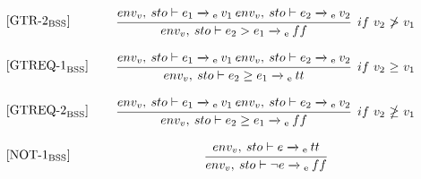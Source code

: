 \begin{equation}
\begin{minipage}{.2\linewidth}
$[\text{GTR-2}_\text{BSS}]$
\end{minipage}
\begin{minipage}{.8\linewidth}
\centering
$\cfrac{env_v, \: sto \vdash e_1 \xrightarrow{}\textsubscript{e} \: v_1 \: env_v, \: sto \vdash e_2 \xrightarrow{}\textsubscript{e} \: v_2}{env_v, \: sto \vdash e_2 > e_1 \xrightarrow{}\textsubscript{e} \: ff}$
$ \: if$ $v_2$ $\not>$ $v_1$
\end{minipage}
\end{equation}

\begin{equation}
\begin{minipage}{.2\linewidth}
$[\text{GTREQ-1}_\text{BSS}]$
\end{minipage}
\begin{minipage}{.8\linewidth}
\centering
$\cfrac{env_v, \: sto \vdash e_1 \xrightarrow{}\textsubscript{e} \: v_1 \: env_v, \: sto \vdash e_2 \xrightarrow{}\textsubscript{e} \: v_2}{env_v, \: sto \vdash e_2 \geq e_1 \xrightarrow{}\textsubscript{e} \: tt}$
$ \: if$ $v_2$ $\geq$ $v_1$
\end{minipage}
\end{equation}

\begin{equation}
\begin{minipage}{.2\linewidth}
$[\text{GTREQ-2}_\text{BSS}]$
\end{minipage}
\begin{minipage}{.8\linewidth}
\centering
$\cfrac{env_v, \: sto \vdash e_1 \xrightarrow{}\textsubscript{e} \: v_1 \: env_v, \: sto \vdash e_2 \xrightarrow{}\textsubscript{e} \: v_2}{env_v, \: sto \vdash e_2 \geq e_1 \xrightarrow{}\textsubscript{e} \: ff}$
$ \: if$ $v_2$ $\ngeq$ $v_1$
\end{minipage}
\end{equation}

\begin{equation}
\begin{minipage}{.2\linewidth}
$[\text{NOT-1}_\text{BSS}]$
\end{minipage}
\begin{minipage}{.8\linewidth}
\centering
$\cfrac{env_v, \: sto \vdash e \xrightarrow{}\textsubscript{e} \: tt}{env_v, \: sto \vdash \neg e \xrightarrow{}\textsubscript{e} \: ff}$
\end{minipage}
\end{equation}

